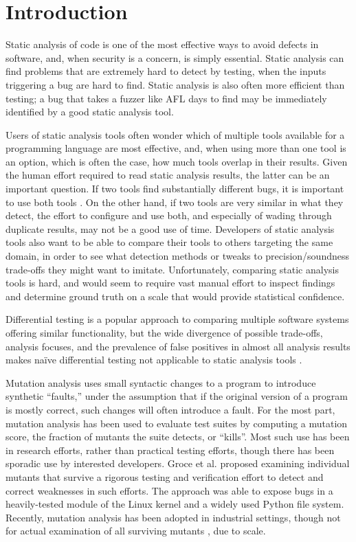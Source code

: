 \section{Introduction}

Static analysis of code is one of the most effective ways to avoid defects in software, and, when security is a concern, is simply essential.  Static analysis can find problems that are extremely hard to detect by testing, when the inputs triggering a bug are hard to find.  Static analysis is also often more efficient than testing; a bug that takes a fuzzer like AFL days to find may be immediately identified by a good static analysis tool.

Users of static analysis tools often wonder which of multiple tools available for a programming language are most effective, and, when using more than one tool is an option, which is often the case, how much tools overlap in their results.  Given the human effort required to read static analysis results, the latter can be an important question.  If two tools find substantially different bugs, it is important to use both tools \cite{AllBugs}.  On the other hand, if two tools are very similar in what they detect, the effort to configure and use both, and especially of wading through duplicate results, may not be a good use of time.  Developers of static analysis tools also want to be able to compare their tools to others targeting the same domain, in order to see what detection methods or tweaks to precision/soundness trade-offs they might want to imitate.  Unfortunately, comparing static analysis tools is hard, and would seem to require vast manual effort to inspect findings and determine ground truth on a scale that would provide statistical confidence.

Differential testing \cite{Differential,ICSEDiff,csmith} is a popular approach to comparing multiple software systems offering similar functionality, but the wide divergence of possible trade-offs, analysis focuses, and the prevalence of false positives in almost all analysis results makes na\"ive differential testing not applicable to static analysis tools \cite{regehrRandom}.

Mutation analysis\cite{jia2011analysis,demillo1978hints,budd1980theoretical} uses small syntactic changes to a program to introduce synthetic ``faults,'' under the assumption that if the original version of a program is mostly correct, such changes will often introduce a fault.  For the most part, mutation analysis has been used to evaluate test suites by computing a mutation score, the fraction of mutants the suite detects, or ``kills''.  Most such use has been in research efforts, rather than practical testing efforts, though there has been sporadic use by interested developers.
Groce et al. \cite{groce2015verified,groce2018verified} proposed examining individual mutants that survive a rigorous testing and verification effort to detect and correct weaknesses in such efforts.  The approach was able to expose bugs in a heavily-tested module of the Linux kernel \cite{mutKernel} and a widely used Python file system.  Recently, mutation analysis has been adopted in industrial settings, though not for actual examination of all surviving mutants \cite{MutGoogle,ivankovic2018industrial}, due to scale.

